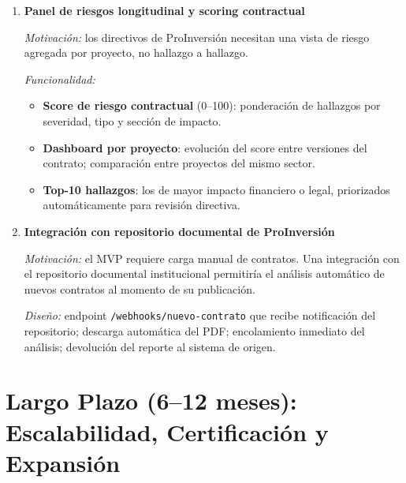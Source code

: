 \begin{enumerate}
    \textit{Funcionalidad:}
    \begin{itemize}
        \item Diff semántico entre dos versiones del mismo contrato:
        hallazgos nuevos, resueltos y persistentes.
        \item Vista ``track changes'' de obligaciones modificadas.
        \item Alerta automática si una adenda introduce una nueva
        inconsistencia en secciones previamente limpias.
    \end{itemize}

    \item \textbf{Panel de riesgos longitudinal y scoring contractual}

    \textit{Motivación:} los directivos de ProInversión necesitan una
    vista de riesgo agregada por proyecto, no hallazgo a hallazgo.

    \textit{Funcionalidad:}
    \begin{itemize}
        \item \textbf{Score de riesgo contractual} (0--100): ponderación
        de hallazgos por severidad, tipo y sección de impacto.
        \item \textbf{Dashboard por proyecto}: evolución del score entre
        versiones del contrato; comparación entre proyectos del mismo
        sector.
        \item \textbf{Top-10 hallazgos}: los de mayor impacto financiero
        o legal, priorizados automáticamente para revisión directiva.
    \end{itemize}

    \item \textbf{Integración con repositorio documental de ProInversión}

    \textit{Motivación:} el MVP requiere carga manual de contratos. Una
    integración con el repositorio documental institucional permitiría
    el análisis automático de nuevos contratos al momento de su publicación.

    \textit{Diseño:} endpoint \texttt{/webhooks/nuevo-contrato} que recibe
    notificación del repositorio; descarga automática del PDF; encolamiento
    inmediato del análisis; devolución del reporte al sistema de origen.

\end{enumerate}

\section*{Largo Plazo (6--12 meses): Escalabilidad, Certificación y Expansión}

